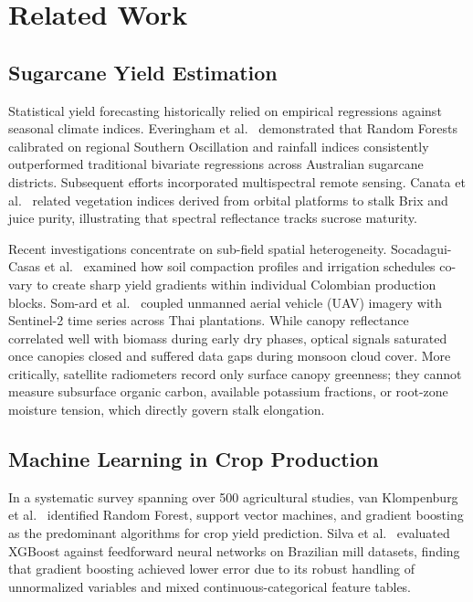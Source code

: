 \documentclass[conference,10pt,letterpaper]{IEEEtran}
\begin{document}
\section{Related Work}

\subsection{Sugarcane Yield Estimation}
Statistical yield forecasting historically relied on empirical regressions against seasonal climate indices. Everingham et al.~\cite{everingham2016accurate} demonstrated that Random Forests calibrated on regional Southern Oscillation and rainfall indices consistently outperformed traditional bivariate regressions across Australian sugarcane districts. Subsequent efforts incorporated multispectral remote sensing. Canata et al.~\cite{canata2024ai} related vegetation indices derived from orbital platforms to stalk Brix and juice purity, illustrating that spectral reflectance tracks sucrose maturity.

Recent investigations concentrate on sub-field spatial heterogeneity. Socadagui-Casas et al.~\cite{socadagui2026spatial} examined how soil compaction profiles and irrigation schedules co-vary to create sharp yield gradients within individual Colombian production blocks. Som-ard et al.~\cite{somard2024sugarcane} coupled unmanned aerial vehicle (UAV) imagery with Sentinel-2 time series across Thai plantations. While canopy reflectance correlated well with biomass during early dry phases, optical signals saturated once canopies closed and suffered data gaps during monsoon cloud cover. More critically, satellite radiometers record only surface canopy greenness; they cannot measure subsurface organic carbon, available potassium fractions, or root-zone moisture tension, which directly govern stalk elongation.

\subsection{Machine Learning in Crop Production}
In a systematic survey spanning over 500 agricultural studies, van Klompenburg et al.~\cite{van2020crop} identified Random Forest, support vector machines, and gradient boosting as the predominant algorithms for crop yield prediction. Silva et al.~\cite{silva2020sugarcane} evaluated XGBoost against feedforward neural networks on Brazilian mill datasets, finding that gradient boosting achieved lower error due to its robust handling of unnormalized variables and mixed continuous-categorical feature tables.
\end{document}
